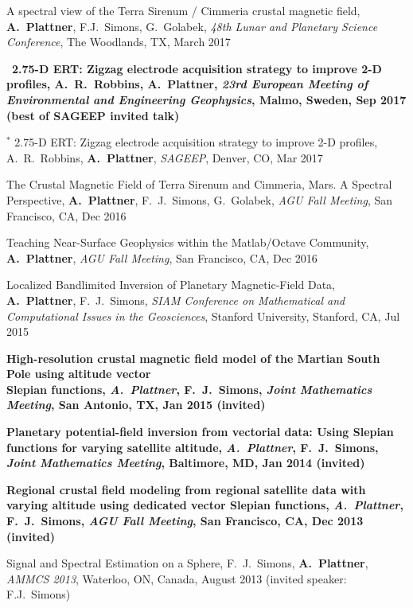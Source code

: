 \documentclass[10pt]{article}
\begin{document}
\spcp
A spectral view of the Terra Sirenum / Cimmeria crustal magnetic field, \textbf{A.~Plattner}, F.J.~Simons, G.~Golabek, \emph{48th Lunar and Planetary Science Conference}, The Woodlands, TX, March 2017

\spcp 
\hspace{-0.3cm}\ug \, \textbf{2.75-D ERT: Zigzag electrode acquisition strategy
to improve 2-D profiles,
A.~R.~Robbins, {\normalfont A.~Plattner},
\emph{23rd European Meeting of Environmental and Engineering Geophysics}, Malmo, Sweden, Sep 2017 (best of SAGEEP invited talk)}

\spcp 
\hspace{-0.4cm} $^*$ 2.75-D ERT: Zigzag electrode acquisition strategy
to improve 2-D profiles,
A.~R.~Robbins, \textbf{A.~Plattner},
\emph{SAGEEP}, Denver, CO, Mar 2017

\spcp
The Crustal Magnetic Field of Terra Sirenum and Cimmeria, Mars. A Spectral Perspective,
\textbf{A.~Plattner}, F.~J.~Simons, G.~Golabek, 
\emph{AGU Fall Meeting}, San Francisco, CA, Dec 2016

\spcp
Teaching Near-Surface Geophysics within the Matlab/Octave Community,
\textbf{A.~Plattner}, 
\emph{AGU Fall Meeting}, San Francisco, CA, Dec 2016

\spcp
Localized Bandlimited Inversion of Planetary Magnetic-Field Data,
\textbf{A.~Plattner}, F.~J.~Simons,
\emph{SIAM Conference on Mathematical and Computational Issues in the Geosciences},
Stanford University, Stanford, CA, Jul 2015


\spcp
\textbf{High-resolution crustal magnetic field model of the Martian South Pole using altitude vector\\ Slepian functions,
\emph{A.~Plattner}, F.~J.~Simons,
\emph{Joint Mathematics Meeting}, San Antonio, TX, Jan 2015 (invited)}

\spcp
\textbf{Planetary potential-field inversion from vectorial data: Using Slepian functions for varying satellite altitude,
\emph{A.~Plattner}, F.~J.~Simons,
\emph{Joint Mathematics Meeting}, Baltimore, MD, Jan 2014 (invited)}

\spcp
\textbf{Regional crustal field modeling from regional satellite data with varying altitude using dedicated vector Slepian functions,
\emph{A.~Plattner}, F.~J.~Simons,
\emph{AGU Fall Meeting}, San Francisco, CA, Dec 2013 (invited)}

\spcp
Signal and Spectral Estimation on a Sphere,
F.~J.~Simons, \textbf{A.~Plattner},
\emph{AMMCS 2013}, Waterloo, ON, Canada, August 2013 (invited speaker: F.J.~Simons)
\end{document}
